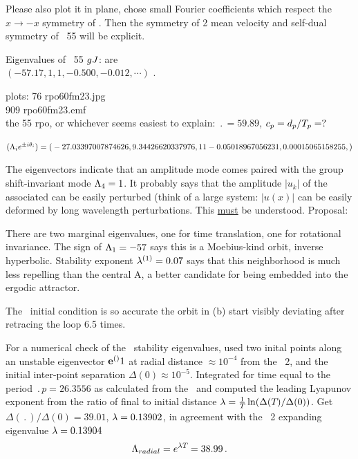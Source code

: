 Please also plot it in plane, chose small Fourier coefficients
 which respect the $x \to -x$ symmetry of \KSe.
Then the symmetry of 2 mean velocity
{\eqva} and self-dual symmetry of \rpo\ {\nameit}55 will be explicit.

Eigenvalues of \rpo\ {\nameit}55 $gJ$: are
\\
$(-57.17,  1, 1, -0.500, -0.012, \cdots)$ .
%

plots:
  76 rpo60fm23.jpg  \\
 909 rpo60fm23.emf  \\
the 55 rpo, or whichever seems easiest to explain:
$\period{} = 59.89$,
$c_p = d_p/{T_{p}}= ?$

$(\Lambda_i e^{\pm i\theta_i})=
(
\\
 -27.03397007874626,
\\
   9.34426620337976,
\\
   1
\\
   1
\\
  -0.05018967056231,
\\
   0.00015065158255,
)$

The eigenvectors
indicate that an amplitude mode comes paired with the
group shift-invariant mode $\Lambda_4 =1$. It probably says that
the amplitude $|u_k|$ of the associated can be easily perturbed (think of
a large system: $|u(x)|$ can be easily deformed by long wavelength
perturbations. This \underline{must} be understood. Proposal:

There are two
marginal eigenvalues, one for time translation, one for
rotational invariance.
The sign of $\Lambda_{1}=-57$ says this is a Moebius-kind orbit,
inverse hyperbolic.
Stability exponent
 $\eigExp[1]=0.07$ says that this neighborhood is much less repelling than
the central {\eqv} A, a better candidate for being embedded into the
ergodic attractor.

The \rpo\ initial condition is
so accurate the orbit in (b)
start visibly deviating after retracing the loop 6.5 times.

For a numerical check of the \rpo\ stability eigenvalues,
used two inital
points along an unstable eigenvector ${\bf e}^{()}{1}$
at radial distance  $\approx 10^{-4}$ from the \eqv\ {\nameit}2,
and the initial inter-point separation $\Delta(0) \approx 10^{-5}$.
Integrated for time equal to the period $\period{p}=26.3556$ as calculated from
the \jacobianM\ and computed the leading Lyapunov exponent from the ratio of
final to initial distance
$\lambda= \frac{1 }{ {T_{}}}\ln( \Delta({T_{}})/\Delta(0))$.
Get
$\Delta(\period{})/\Delta(0) =39.01$,
$\lambda=0.13902$, in agreement with the \eqv\ {\nameit}2
expanding eigenvalue $\lambda=0.13904$
\[
\Lambda_{radial} =  e^{\lambda {\ensuremath{T_{}}}} =38.99
\,.
\]


